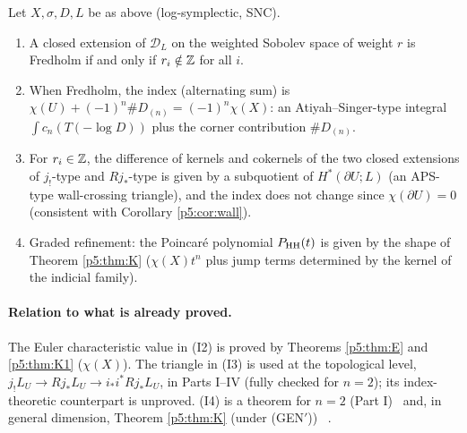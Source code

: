 \begin{conj}\label{p5:conj:index}
Let $X,\sigma,D,L$ be as above (log-symplectic, SNC).
\begin{enumerate}
\item[(I1)] A closed extension of $\mathcal D_L$ on the weighted Sobolev space of weight $r$ is Fredholm if and only if $r_i\notin\mathbb Z$ for all $i$.
\item[(I2)] When Fredholm, the index (alternating sum) is $\chi(U)+(-1)^n\#D_{(n)}=(-1)^n\chi(X)$: an Atiyah--Singer-type integral $\int c_n(T(-\log D))$ plus the corner contribution $\#D_{(n)}$.
\item[(I3)] For $r_i\in\mathbb Z$, the difference of kernels and cokernels of the two closed extensions of $j_!$-type and $Rj_*$-type is given by a subquotient of $H^*(\partial U;L)$ (an APS-type wall-crossing triangle), and the index does not change since $\chi(\partial U)=0$ (consistent with Corollary \ref{p5:cor:wall}).
\item[(I4)] Graded refinement: the Poincar\'e polynomial $P_{\mathrm{HH}}(t)$ is given by the shape of Theorem \ref{p5:thm:K} ($\chi(X)t^n$ plus jump terms determined by the kernel of the indicial family).
\end{enumerate}
\end{conj}
\paragraph{Relation to what is already proved.} The Euler characteristic value in (I2) is proved by Theorems \ref{p5:thm:E} and \ref{p5:thm:K1} ($\chi(X)$). The triangle in (I3) is used at the topological level, $j_!L_U\to Rj_*L_U\to i_*i^*Rj_*L_U$, in Parts I--IV (fully checked for $n=2$); its index-theoretic counterpart is unproved. (I4) is a theorem for $n=2$ (Part I) \tP\ and, in general dimension, Theorem \ref{p5:thm:K} (under (GEN$'$)) \tP\ \tQ.

